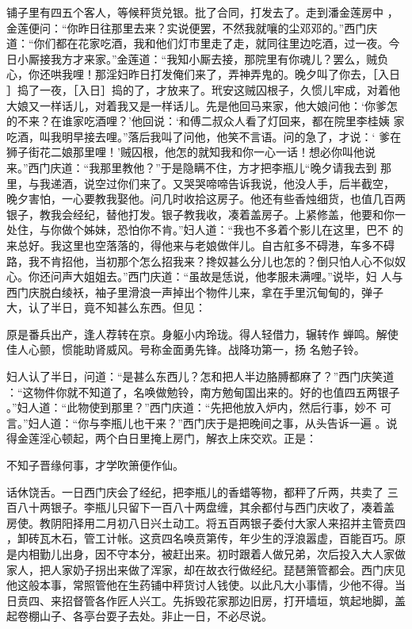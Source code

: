 铺子里有四五个客人，等候秤货兑银。批了合同，打发去了。走到潘金莲房中
，金莲便问：“你昨日往那里去来？实说便罢，不然我就嚷的尘邓邓的。”西门庆
道：“你们都在花家吃酒，我和他们灯市里走了走，就同往里边吃酒，过一夜。今
日小厮接我方才来家。”金莲道：“我知小厮去接，那院里有你魂儿？罢么，贼负
心，你还哄我哩！那淫妇昨日打发俺们来了，弄神弄鬼的。晚夕叫了你去，［入日
］捣了一夜，［入日］捣的了，才放来了。玳安这贼囚根子，久惯儿牢成，对着他
大娘又一样话儿，对着我又是一样话儿。先是他回马来家，他大娘问他：‘你爹怎
的不来？在谁家吃酒哩？’他回说：‘和傅二叔众人看了灯回来，都在院里李桂姨
家吃酒，叫我明早接去哩。”落后我叫了问他，他笑不言语。问的急了，才说：‘
爹在狮子街花二娘那里哩！’贼囚根，他怎的就知我和你一心一话！想必你叫他说
来。”西门庆道：“我那里教他？”于是隐瞒不住，方才把李瓶儿“晚夕请我去到
那里，与我递酒，说空过你们来了。又哭哭啼啼告诉我说，他没人手，后半截空，
晚夕害怕，一心要教我娶他。问几时收拾这房子。他还有些香烛细货，也值几百两
银子，教我会经纪，替他打发。银子教我收，凑着盖房子。上紧修盖，他要和你一
处住，与你做个姊妹，恐怕你不肯。”妇人道：“我也不多着个影儿在这里，巴不
的来总好。我这里也空落落的，得他来与老娘做伴儿。自古舡多不碍港，车多不碍
路，我不肯招他，当初那个怎么招我来？搀奴甚么分儿也怎的？倒只怕人心不似奴
心。你还问声大姐姐去。”西门庆道：“虽故是恁说，他孝服未满哩。”说毕，妇
人与西门庆脱白绫袄，袖子里滑浪一声掉出个物件儿来，拿在手里沉甸甸的，弹子
大，认了半日，竟不知甚么东西。但见：

原是番兵出产，逢人荐转在京。身躯小内玲珑。得人轻借力，辗转作
蝉鸣。解使佳人心颤，惯能助肾威风。号称金面勇先锋。战降功第一，扬
名勉子铃。

妇人认了半日，问道：“是甚么东西儿？怎和把人半边胳膊都麻了？”西门庆笑道
：“这物件你就不知道了，名唤做勉铃，南方勉甸国出来的。好的也值四五两银子
。”妇人道：“此物使到那里？”西门庆道：“先把他放入炉内，然后行事，妙不
可言。”妇人道：“你与李瓶儿也干来？”西门庆于是把晚间之事，从头告诉一遍
。说得金莲淫心顿起，两个白日里掩上房门，解衣上床交欢。正是：

不知子晋缘何事，才学吹箫便作仙。

话休饶舌。一日西门庆会了经纪，把李瓶儿的香蜡等物，都秤了斤两，共卖了
三百八十两银子。李瓶儿只留下一百八十两盘缠，其余都付与西门庆收了，凑着盖
房使。教阴阳择用二月初八日兴土动工。将五百两银子委付大家人来招并主管贲四
，卸砖瓦木石，管工计帐。这贲四名唤贲第传，年少生的浮浪嚣虚，百能百巧。原
是内相勤儿出身，因不守本分，被赶出来。初时跟着人做兄弟，次后投入大人家做
家人，把人家奶子拐出来做了浑家，却在故衣行做经纪。琵琶箫管都会。西门庆见
他这般本事，常照管他在生药铺中秤货讨人钱使。以此凡大小事情，少他不得。当
日贲四、来招督管各作匠人兴工。先拆毁花家那边旧房，打开墙垣，筑起地脚，盖
起卷棚山子、各亭台耍子去处。非止一日，不必尽说。

